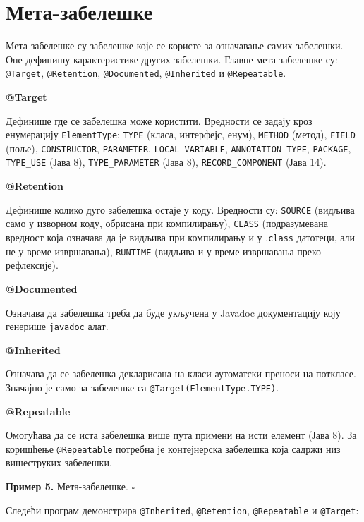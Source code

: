 \section{Мета-забелешке}

Мета-забелешке су забелешке које се користе за означавање самих забелешки. Оне дефинишу карактеристике других забелешки. Главне мета-забелешке су: \texttt{@Target}, \texttt{@Retention}, \texttt{@Documented}, \texttt{@Inherited} и \texttt{@Repeatable}.


\textbf{@Target}

Дефинише где се забелешка може користити. Вредности се задају кроз енумерацију \texttt{ElementType}: \texttt{TYPE} (класа, интерфејс, енум), \texttt{METHOD} (метод), \texttt{FIELD} (поље), \texttt{CONSTRUCTOR}, \texttt{PARAMETER}, \texttt{LOCAL\_VARIABLE}, \texttt{ANNOTATION\_TYPE}, \texttt{PACKAGE}, \texttt{TYPE\_USE} (Јава 8), \texttt{TYPE\_PARAMETER} (Јава 8), \texttt{RECORD\_COMPONENT} (Јава 14).


\textbf{@Retention}

Дефинише колико дуго забелешка остаје у коду. Вредности су: \texttt{SOURCE} (видљива само у изворном коду, обрисана при компилирању), \texttt{CLASS} (подразумевана вредност која означава да је видљива при компилирању и у .\texttt{class} датотеци, али не у време извршавања), \texttt{RUNTIME} (видљива и у време извршавања преко рефлексије).


\textbf{@Documented}

Означава да забелешка треба да буде укључена у Javadoc документацију коју генерише \texttt{javadoc} алат.


\textbf{@Inherited}

Означава да се забелешка декларисана на класи аутоматски преноси на поткласе. Значајно је само за забелешке са \texttt{@Target(ElementType.TYPE)}.


\textbf{@Repeatable}

Омогућава да се иста забелешка више пута примени на исти елемент (Јава 8). За коришћење \texttt{@Repeatable} потребна је контејнерска забелешка која садржи низ вишеструких забелешки.


\bigskip

\noindent \textbf{Пример 5.} Мета-забелешке. $\square$

\medskip

Следећи програм демонстрира \texttt{@Inherited}, \texttt{@Retention}, \texttt{@Repeatable} и \texttt{@Target}:

